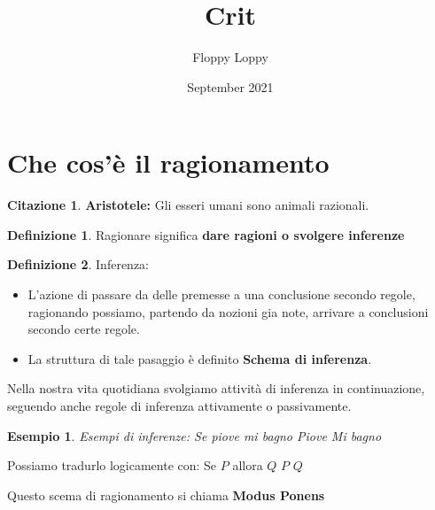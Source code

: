 \documentclass{article}
\newtheorem{exmp}{Esempio}[section]
\theoremstyle{definition}
\newtheorem{cit}{Citazione}[section]
\newtheorem{definition}{Definizione}[section]
\begin{document}
\title{Crit}
\author{Floppy Loppy}
\date{September 2021}
\maketitle
\tableofcontents
\newpage



\section{Che cos'è il ragionamento}
\begin{tcolorbox}
        
\begin{cit}
        \textbf{Aristotele:} Gli esseri umani sono animali razionali. 
\end{cit}
\end{tcolorbox}
\begin{definition}
       Ragionare significa \textbf{dare ragioni o svolgere inferenze}  
\end{definition}
\begin{definition}
        Inferenza: \newline
        \begin{itemize}
                \item L'azione di passare da delle premesse a una conclusione secondo regole, ragionando possiamo, partendo da nozioni gia note, arrivare a conclusioni secondo certe regole.
                \item La struttura di tale pasaggio è definito \textbf{Schema di inferenza}. 
        \end{itemize}
\end{definition}
Nella nostra vita quotidiana svolgiamo attività di inferenza in continuazione, seguendo anche regole di inferenza attivamente o passivamente.

\begin{exmp}
        Esempi di inferenze: \newline
        Se piove mi bagno \newline
        Piove \newline
        Mi bagno 
\end{exmp}

\begin{tcolorbox}
        Possiamo tradurlo logicamente con: \newline
        Se $ P $ allora $ Q $ \newline
        $ P $ \newline
        $ Q $ \newline 
\end{tcolorbox}
Questo scema di ragionamento si chiama \textbf{Modus Ponens} \par
\end{document}
